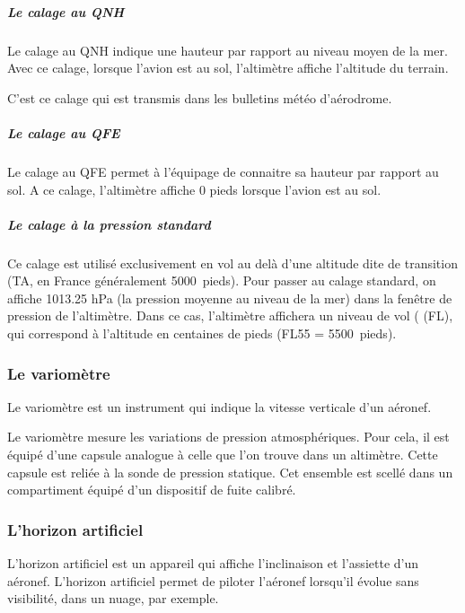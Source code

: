 	\subparagraph{Le calage au QNH}
	Le calage au QNH indique une hauteur par rapport au niveau moyen de la mer. Avec ce calage, lorsque l'avion est au sol, l'altimètre affiche l'altitude du terrain.
	
	C'est ce calage qui est transmis dans les bulletins météo d'aérodrome.
	
	\subparagraph{Le calage au QFE}
	Le calage au QFE permet à l'équipage de connaitre sa hauteur par rapport au sol. A ce calage, l'altimètre affiche 0 pieds lorsque l'avion est au sol.
	
	\subparagraph{Le calage à la pression standard}
	Ce calage est utilisé exclusivement en vol au delà d'une altitude dite de transition (TA, en France généralement 5000~pieds). Pour passer au calage standard, on affiche 1013.25 hPa (la pression moyenne au  niveau de la mer) dans la fenêtre de pression de l'altimètre. Dans ce cas, l'altimètre affichera un niveau de vol ( (FL), qui correspond à l'altitude en centaines de pieds (FL55 = 5500~pieds).
	
	\subsubsection{Le variomètre}
	Le \gls{variomètre}  est un instrument qui indique la vitesse verticale d'un aéronef.
	
	\begin{figure}[H]	
	\centering
	\end{figure}
	
	Le variomètre mesure les variations de pression atmosphériques. Pour cela, il est équipé d'une capsule analogue à celle que l'on trouve dans un altimètre. Cette capsule est reliée à la sonde de pression statique. Cet ensemble est scellé dans un compartiment équipé d'un dispositif de fuite calibré. 
	
	
	\subsubsection{L'horizon artificiel}
	L'\gls{horizon artificiel}  est un appareil qui affiche l'inclinaison et l'assiette d'un aéronef. L'horizon artificiel permet de piloter l'aéronef lorsqu'il évolue sans visibilité, dans un nuage, par exemple.
	
